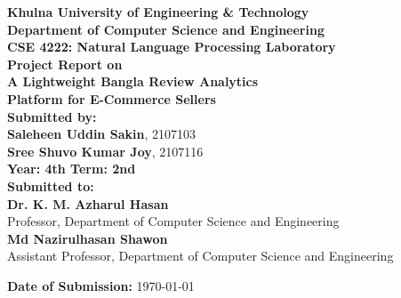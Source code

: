 \documentclass[12pt,a4paper]{article}
\begin{document}
\begin{titlepage}
    \centering
    \vspace*{0.3cm}
    
    {\LARGE \textbf{Khulna University of Engineering \& Technology}}\\[0.35cm]
    {\Large \textbf{Department of Computer Science and Engineering}}\\[1.5cm]
    
    {\Large \textbf{CSE 4222: Natural Language Processing Laboratory}}\\[1.5cm]
    
    {\Large \textbf{Project Report on}}\\[0.6cm]
    {\huge \textbf{A Lightweight Bangla Review Analytics}}\\[0.35cm]
    {\huge \textbf{Platform for E-Commerce Sellers}}\\[1.8cm]
        
    {\Large \textbf{Submitted by:}}\\[0.45cm]
    {\large \textbf{Saleheen Uddin Sakin}, 2107103}\\[0.25cm]
    {\large \textbf{Sree Shuvo Kumar Joy}, 2107116}\\[0.45cm]
    {\large \textbf{Year: 4th \quad Term: 2nd}}\\[1.5cm]
    
    {\Large \textbf{Submitted to:}}\\[0.45cm]
    {\large \textbf{Dr. K. M. Azharul Hasan}}\\[0.15cm]
    {\normalsize Professor, Department of Computer Science and Engineering}\\[0.55cm]
    {\large \textbf{Md Nazirulhasan Shawon}}\\[0.15cm]
    {\normalsize Assistant Professor, Department of Computer Science and Engineering}
    
    \vfill
    
    {\normalsize \textbf{Date of Submission:} \today}\\[0.3cm]
\end{titlepage}

\newpage
{}
\setcounter{page}{1}
\end{document}
